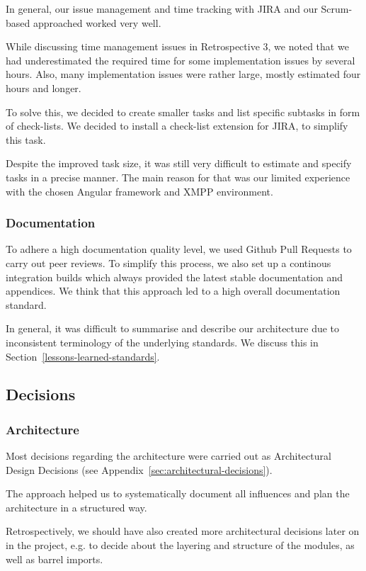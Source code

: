 In general, our issue management and time tracking with JIRA and our Scrum-based approached worked very well.

While discussing time management issues in Retrospective 3, we noted that we had underestimated the required time for some implementation issues by several hours.
Also, many implementation issues were rather large, mostly estimated four hours and longer.

To solve this, we decided to create smaller tasks and list specific subtasks in form of check-lists.
We decided to install a check-list extension for JIRA, to simplify this task.

Despite the improved task size, it was still very difficult to estimate and specify tasks in a precise manner.
The main reason for that was our limited experience with the chosen Angular framework and XMPP environment.

\subsubsection{Documentation}

To adhere a high documentation quality level, we used Github Pull Requests to carry out peer reviews.
To simplify this process, we also set up a continous integration builds which always provided the latest stable documentation and appendices.
We think that this approach led to a high overall documentation standard.

In general, it was difficult to summarise and describe our architecture due to inconsistent terminology of the underlying standards.
We discuss this in Section~\ref{lessons-learned-standards}.


\subsection{Decisions}
\subsubsection{Architecture}

Most decisions regarding the architecture were carried out as Architectural Design Decisions \cite{architectural-design-decisions} (see Appendix~\ref{sec:architectural-decisions}).

The approach helped us to systematically document all influences and plan the architecture in a structured way.

Retrospectively, we should have also created more architectural decisions later on in the project, e.g. to decide about the layering and structure of the modules, as well as barrel imports.


